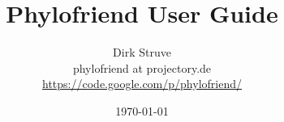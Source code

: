 \begin{titlepage}

\title{Phylofriend User Guide}

\author{Dirk Struve\\
phylofriend at projectory.de\\
\href{https://code.google.com/p/phylofriend/}{https://code.google.com/p/phylofriend/}}
\date{\today}
\end{titlepage}
\maketitle
